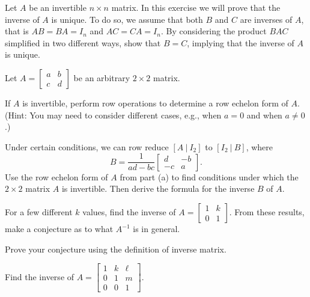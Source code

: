 
\be


\item \label{ex:2_c_unique_inverse} Let $A$ be an invertible $n \times n$ matrix. In this exercise we will prove that the inverse of $A$ is unique. To do so, we assume that both $B$ and $C$ are inverses of $A$, that is $AB=BA = I_n$ and $AC=CA = I_n$. By considering the product $BAC$ simplified in two different ways, show that $B=C$, implying that the inverse of $A$ is unique. 

\item \label{ex:2_c_2by2_inverse} Let $A = \left[ \begin{array}{cc} a&b \\ c&d \end{array} \right]$ be an arbitrary $2 \times 2$ matrix. 
	\ba
	\item If $A$ is invertible, perform row operations to determine a row echelon form of $A$. (Hint: You may need to consider different cases, e.g., when $a=0$ and when $a \neq 0$.)

	\item Under certain conditions, we can row reduce $[A \ | \ I_2]$ to $[I_2 \ | \ B]$, where 
\[B=\frac{1}{ad-bc} \left[ \begin{array}{rr} d&-b \\ -c&a \end{array} \right].\]
Use the row echelon form of $A$ from part (a) to find conditions under which the $2 \times 2$ matrix $A$ is invertible. Then derive the formula for the inverse $B$ of $A$. 
	\ea

\item \ba 
\item For a few different $k$ values, find the inverse of $A = \left[ \begin{array}{cc} 1&k \\ 0&1 \end{array} \right]$. From these results, make a conjecture as to what $A^{-1}$ is in general.

\item Prove your conjecture using the definition of inverse matrix. 

\item Find the inverse of $A = \left[ \begin{array}{ccc} 1&k&\ell \\ 0&1&m\\0&0&1 \end{array} \right]$.
\ea

